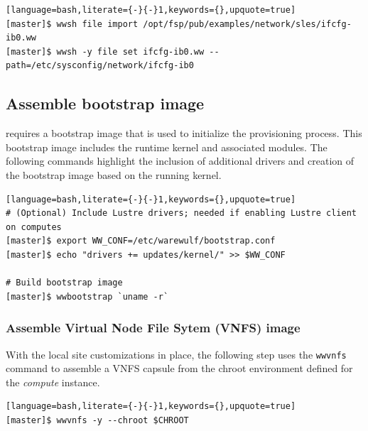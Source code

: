 \documentclass[letterpaper]{article}
\begin{document}
\begin{lstlisting}[language=bash,literate={-}{-}1,keywords={},upquote=true]
[master]$ wwsh file import /opt/fsp/pub/examples/network/sles/ifcfg-ib0.ww
[master]$ wwsh -y file set ifcfg-ib0.ww --path=/etc/sysconfig/network/ifcfg-ib0
\end{lstlisting}


\subsection{Assemble bootstrap image}

\Warewulf{} requires a bootstrap image that is used to initialize the provisioning
process. This bootstrap image includes the runtime kernel and associated
modules. The following commands highlight the inclusion of additional drivers
and creation of the bootstrap image based on the running kernel.

\begin{lstlisting}[language=bash,literate={-}{-}1,keywords={},upquote=true]
# (Optional) Include Lustre drivers; needed if enabling Lustre client on computes
[master]$ export WW_CONF=/etc/warewulf/bootstrap.conf
[master]$ echo "drivers += updates/kernel/" >> $WW_CONF

# Build bootstrap image
[master]$ wwbootstrap `uname -r`
\end{lstlisting}

\subsubsection{Assemble Virtual Node File Sytem (VNFS) image}

With the local site customizations in place, the following step uses the
\texttt{wwvnfs} command to assemble a VNFS capsule from the chroot environment
defined for the {\em compute} instance. 

\begin{lstlisting}[language=bash,literate={-}{-}1,keywords={},upquote=true]
[master]$ wwvnfs -y --chroot $CHROOT
\end{lstlisting}
\end{document}
